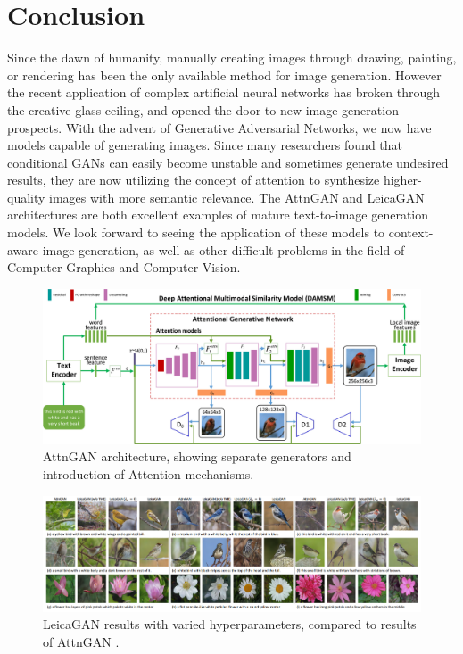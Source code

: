 \documentclass[letterpaper]{article} %
\begin{document}
\section{Conclusion}
\label{sec:conclusion}
Since the dawn of humanity, manually creating images through drawing, 
painting, or rendering has been the only available method for image generation. 
However the recent application of complex artificial neural networks
has broken through the creative glass ceiling, and opened the door to new image 
generation prospects. With the advent of Generative Adversarial Networks, we 
now have models capable of generating images. Since many researchers found that 
conditional GANs can easily become unstable and sometimes generate 
undesired results, they are now utilizing the concept of 
attention to synthesize higher-quality images with more semantic relevance. 
The AttnGAN and LeicaGAN architectures are both excellent examples of mature 
text-to-image generation models. We look forward to seeing the application of 
these models to context-aware image generation, as well as other difficult 
problems in the field of Computer Graphics and Computer Vision.

\begin{figure}[htbp]
	\centerline{\includegraphics[width=\linewidth]{attngan.png}}
	\caption{AttnGAN architecture, showing separate generators and introduction 
		of Attention mechanisms.}
	\label{fig:attngan}
\end{figure}

\begin{figure}[htbp]
	\centerline{\includegraphics[width=\linewidth]{leicagan.png}}
	\caption{LeicaGAN results with varied hyperparameters, compared to results 
		of AttnGAN
		\cite{leica}.}
	\label{fig:leicagan}
\end{figure}



\end{document}
